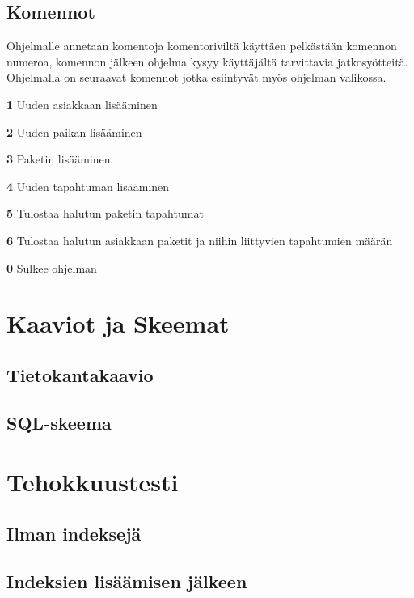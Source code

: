 \documentclass[12pt,a4paper]{article}
\begin{document}
\subsection*{Komennot}
Ohjelmalle annetaan komentoja komentoriviltä käyttäen pelkästään komennon numeroa, komennon jälkeen ohjelma kysyy käyttäjältä tarvittavia jatkosyötteitä. Ohjelmalla on seuraavat komennot jotka esiintyvät myös ohjelman valikossa.
\begin{description}

\item \textbf{1} Uuden asiakkaan lisääminen
\item \textbf{2} Uuden paikan lisääminen
\item \textbf{3} Paketin lisääminen
\item \textbf{4} Uuden tapahtuman lisääminen
\item \textbf{5} Tulostaa halutun paketin tapahtumat
\item \textbf{6} Tulostaa halutun asiakkaan paketit ja niihin liittyvien tapahtumien määrän
\item \textbf{0} Sulkee ohjelman 

\end{description}



\newpage
\section{Kaaviot ja Skeemat}
\subsection*{Tietokantakaavio}


\subsection*{SQL-skeema}

\newpage
\section{Tehokkuustesti}
\subsection*{Ilman indeksejä}
\subsection*{Indeksien lisäämisen jälkeen}
\end{document}
